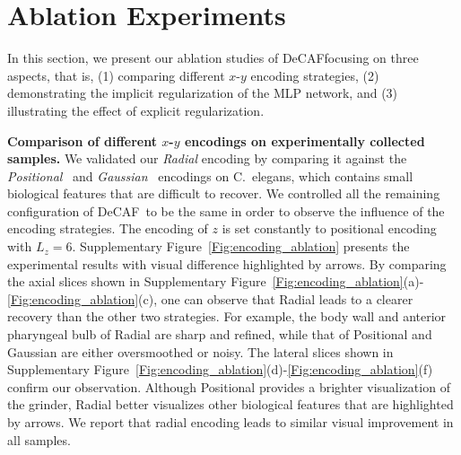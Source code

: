 \documentclass[11pt]{article}
\theoremstyle{plain} %
\def\proposed{DeCAF}
\begin{document}
\section*{Ablation Experiments}
In this section, we present our ablation studies of \proposed focusing on three aspects, that is, (1) comparing different $x$-$y$ encoding strategies, (2) demonstrating the implicit regularization of the MLP network, and (3) illustrating the effect of explicit regularization. 

\vspace{0.5em}
\noindent
\textbf{Comparison of different $x$-$y$ encodings on experimentally collected samples.}
We validated our \emph{Radial} encoding by comparing it against the \emph{Positional}~\cite{Mildenhall.etal2020} and \emph{Gaussian}~\cite{Tancik.etal2020} encodings on C.\ elegans, which contains small biological features that are difficult to recover.
We controlled all the remaining configuration of \proposed~to be the same in order to observe the influence of the encoding strategies.
The encoding of $z$ is set constantly to positional encoding with $L_z=6$.
Supplementary Figure~\ref{Fig:encoding_ablation} presents the experimental results with visual difference highlighted by arrows.
By comparing the axial slices shown in Supplementary Figure~\ref{Fig:encoding_ablation}(a)-\ref{Fig:encoding_ablation}(c), one can observe that Radial leads to a clearer recovery than the other two strategies. 
For example, the body wall and anterior pharyngeal bulb of Radial are sharp and refined, while that of Positional and Gaussian are either oversmoothed or noisy.
The lateral slices shown in Supplementary Figure~\ref{Fig:encoding_ablation}(d)-\ref{Fig:encoding_ablation}(f) confirm our observation.
Although Positional provides a brighter visualization of the grinder, Radial better visualizes other biological features that are highlighted by arrows.
We report that radial encoding leads to similar visual improvement in all samples.
\end{document}
